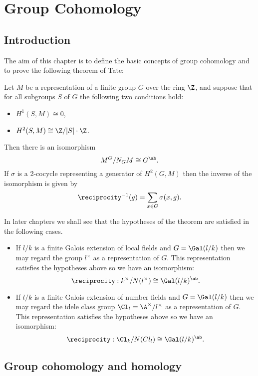 \chapter{Group Cohomology}

\section{Introduction}

The aim of this chapter is to define the basic concepts of group cohomology and to
prove the following theorem of Tate:

\begin{theorem}
	Let $M$ be a representation of a finite group $G$ over the ring $\Z$, and suppose
	that for all subgroups $S$ of $G$ the following two conditions hold:
	\begin{itemize}
		\item
		$H^1(S,M) \cong 0$,
		\item
		$H^2(S,M) \cong \Z / |S| \cdot \Z$.
	\end{itemize}
	Then there is an isomorphism
	\[
		 M^G / N_G M \cong G^{\ab}.
	\]
	If $\sigma$ is a 2-cocycle representing a generator of $H^2(G,M)$ then the inverse of the
	isomorphism is given by
	\[
		\reciprocity^{-1}(g) = \sum_{x \in G} \sigma(x,g).
	\]
\end{theorem}

In later chapters we shall see that the hypotheses of the theorem are satisfied in the following
cases.
\begin{itemize}
	\item
	If $l/k$ is a finite Galois extension of local fields and $G = \Gal(l/k)$ then we
	may regard the group $l^\times$ as a representation of $G$. This representation
	satisfies the hypotheses above so we have an isomorphism:
	\[
		\reciprocity :  k^\times / N(l^\times) \cong \Gal(l/k)^{\ab}.
	\]
	\item
	If $l/k$ is a finite Galois extension of number fields and $G = \Gal(l/k)$ then we
	may regard the idele class group $\Cl_l = \A^\times / l^\times$ as a representation of $G$.
	This representation satisfies the hypotheses above so we have an isomorphism:
	\[
		\reciprocity : \Cl_k / N(Cl_l) \cong \Gal(l/k)^{\ab} .
	\]
\end{itemize}






\section{Group cohomology and homology}

